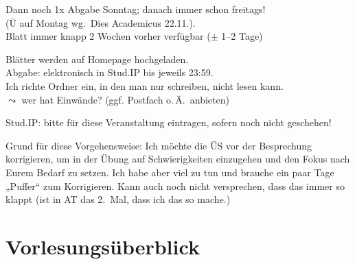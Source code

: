 \begin{frame}
{\begin{footnotesize}
          \par\smallskip        
          Dann noch 1x Abgabe Sonntag; danach immer schon freitags! \\
          (Ü auf Montag wg.\ Dies Academicus 22.11.). \\
          Blatt immer knapp 2 Wochen vorher verfügbar ($\pm$ 1--2 Tage)
          
          \par\smallskip        
          Blätter werden auf Homepage hochgeladen. \\
          Abgabe: elektronisch in Stud.IP bis jeweils 23:59. \\
          Ich richte Ordner ein, in den man nur schreiben, nicht lesen kann. \\
          $\leadsto$ wer hat Einwände?  (ggf. Postfach o.\,Ä.\ anbieten)
          
          \par\smallskip        
          Stud.IP:  bitte für diese Veranstaltung eintragen, sofern noch nicht geschehen!
          
          \par\smallskip
          Grund für diese Vorgehensweise:
          Ich möchte die ÜS vor der Besprechung korrigieren,
          um in der Übung auf Schwierigkeiten einzugehen und den Fokus nach Eurem Bedarf zu setzen.
          Ich habe aber viel zu tun und brauche ein paar Tage „Puffer“ zum Korrigieren.
          Kann auch noch nicht versprechen, dass das immer so klappt
          (ist in AT das 2.\ Mal, dass ich das so mache.)
          
          \par
        \end{footnotesize}
      }
    \end{frame}

  \section{Vorlesungsüberblick}


